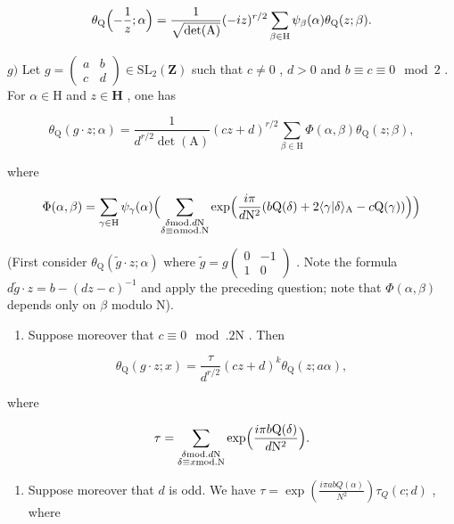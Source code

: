 \[
\theta_ {\mathrm{Q}} \Bigl (- \frac {1}{z}; \alpha \Bigr) = \frac {1}{\sqrt {\det (\mathrm{A})}} (- i z) ^ {r / 2} \sum_ {\beta \in \mathrm{H}} \psi_ {\beta} (\alpha) \theta_ {\mathrm{Q}} (z; \beta).
\]

\(g)\) Let \(g = \begin{pmatrix} a & b \\ c & d \end{pmatrix} \in \mathrm{SL}_2(\mathbf{Z})\) such that \(c \neq 0\) , \(d > 0\) and \(b \equiv c \equiv 0 \mod 2\) . For \(\alpha \in \mathrm{H}\) and \(z \in \mathbf{H}\) , one has

\[
\theta_ {\mathrm{Q}} (g \cdot z; \alpha) = \frac {1}{d ^ {r / 2} \det (\mathrm{A})} (c z + d) ^ {r / 2} \sum_ {\beta \in \mathrm{H}} \Phi (\alpha , \beta) \theta_ {\mathrm{Q}} (z; \beta),
\]

where

\[
\Phi (\alpha ,\beta) = \sum_{\gamma \in \mathrm{H}}\psi_{\gamma}(\alpha)\Bigl (\sum_{\substack{\delta \text{mod.} d\mathrm{N}\\ \delta \equiv \alpha \text{mod.}\mathrm{N}}}\exp \Bigl (\frac{i\pi}{d\mathrm{N}^{2}} (b\mathrm{Q}(\delta) + 2\langle \gamma |\delta \rangle_{\mathrm{A}} - c\mathrm{Q}(\gamma))\Bigr)\Bigr)
\]

(First consider \(\theta_{\mathrm{Q}}(\widetilde{g} \cdot z; \alpha)\) where \(\widetilde{g} = g\begin{pmatrix} 0 & -1 \\ 1 & 0 \end{pmatrix}\) . Note the formula \(d\widetilde{g} \cdot z = b - (dz - c)^{-1}\) and apply the preceding question; note that \(\Phi(\alpha, \beta)\) depends only on \(\beta\) modulo N).

\begin{enumerate}
\def\labelenumi{\alph{enumi})}
\setcounter{enumi}{7}
\tightlist
\item
  Suppose moreover that \(c \equiv 0 \mod. 2\mathrm{N}\) . Then
\end{enumerate}

\[
\theta_ {\mathrm{Q}} (g \cdot z; x) = \frac {\tau}{d ^ {r / 2}} (c z + d) ^ {k} \theta_ {\mathrm{Q}} (z; a \alpha),
\]

where

\[
\tau = \sum_{\substack{\delta \text{mod.} d\mathrm{N}\\ \delta \equiv x\text{mod.}\mathrm{N}}}\exp \Bigl (\frac{i\pi b\mathrm{Q}(\delta)}{d\mathrm{N}^{2}}\Bigr).
\]

\begin{enumerate}
\def\labelenumi{\roman{enumi})}
\tightlist
\item
  Suppose moreover that \(d\) is odd. We have \(\tau = \exp \left(\frac{i\pi abQ(\alpha)}{N^2}\right)\tau_Q(c;d)\) , where
\end{enumerate}

